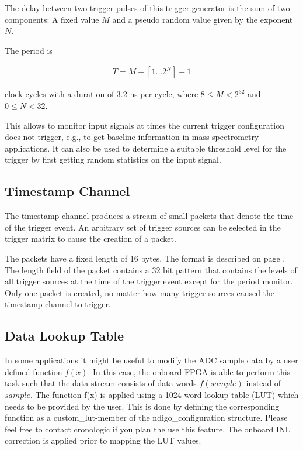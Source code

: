         The delay between two trigger pulses of this trigger generator is the sum of two components: A fixed value $M$ and a pseudo random value given by the exponent $N$. \par

        The period is

        \begin{align}
            T = M + [1...2^N] - 1
        \end{align}

        clock cycles with a duration of 3.2 ns per cycle, where $8 \leq M < 2^{32}$ and $0 \leq N < 32$.\par

        This allows to monitor input signals at times the current trigger configuration does not trigger, e.g., to get baseline information in mass spectrometry applications. It can also be used to determine a suitable threshold level for the trigger by first getting random statistics on the input signal.

    \subsection{Timestamp Channel}

        The timestamp channel produces a stream of small packets that denote the time of the trigger event. An arbitrary set of trigger sources can be selected in the trigger matrix to cause the creation of a packet.\par

        The packets have a fixed length of 16 bytes. The format is described on page \pageref{cp:packetformat}. The length field of the packet contains a 32 bit pattern that contains the levels of all trigger sources at the time of the trigger event except for the period monitor. Only one packet is created, no matter how many trigger sources caused the timestamp channel to trigger.

    \subsection{Data Lookup Table}

        In some applications it might be useful to modify the ADC sample data by a user defined function $f(x)$. In this case, the onboard FPGA is able to perform this task such that the data stream consists of data words $f(sample)$ instead of $sample$. The function f(x) is applied using a 1024 word lookup table (LUT) which needs to be provided by the user. This is done by defining the corresponding function as a custom\_lut-member of the ndigo\_configuration structure. Please feel free to contact cronologic if you plan the use this feature. The onboard INL correction is applied prior to mapping the LUT values.

